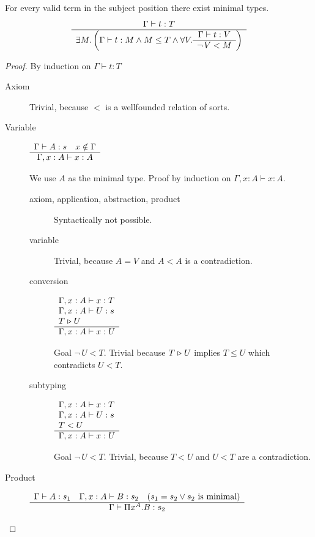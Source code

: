 \begin{theorem}
  For every valid term in the subject position there exist minimal types.
  $$
  \begin{array}{c} \Gamma \vdash t: T \\ \hline \exists M.
    \left (
      \Gamma \vdash t : M \land
      M \le T \land
      \forall V.
      \begin{array}{c} \Gamma \vdash t: V \\ \hline \lnot\, V < M\end{array}
    \right )
  \end{array}
  $$

  \begin{proof}
    By induction on $\Gamma \vdash t: T$
    \begin{description}

    \item[Axiom] Trivial, because $<$ is a wellfounded relation of sorts.

    \item[Variable]
      $\begin{array}{c} \Gamma \vdash A:s\quad x \notin \Gamma \\ \hline \Gamma,x:A \vdash x:A\end{array}$

      We use $A$ as the minimal type. Proof by induction on
      $\Gamma,x:A \vdash x:A$.
      \begin{description}

      \item[axiom, application, abstraction, product] Syntactically not
        possible.

      \item[variable] Trivial, because $A = V$ and $A < A$ is a contradiction.

      \item[conversion]
        $\begin{array}{l} 
          \Gamma,x:A \vdash x: T \\
          \Gamma,x:A \vdash U: s \\
          T \mathrel{\triangleright} U
         \\ \hline \Gamma,x:A \vdash x: U\end{array}$

        Goal $\lnot\, U < T$.  Trivial because $T \mathrel{\triangleright} U$ implies $T \le U$
        which contradicts $U < T$.


      \item[subtyping]
        $\begin{array}{l} 
          \Gamma,x:A \vdash x: T \\
          \Gamma,x:A \vdash U: s \\
          T < U
         \\ \hline \Gamma,x:A \vdash x: U\end{array}$

        Goal $\lnot\, U < T$.  Trivial, because $T < U$ and $U < T$ are a
        contradiction.
      \end{description}

    \item[Product]
      $
      \begin{array}{c} \Gamma \vdash A:s_1 \quad
        \Gamma,x:A \vdash B:s_2 \quad
        (s_1 = s_2 \lor s_2 \text{ is minimal})  \\ \hline \Gamma \vdash \Pi x^A . B : s_2\end{array}      $


\end{description}
\end{proof}
\end{theorem}
